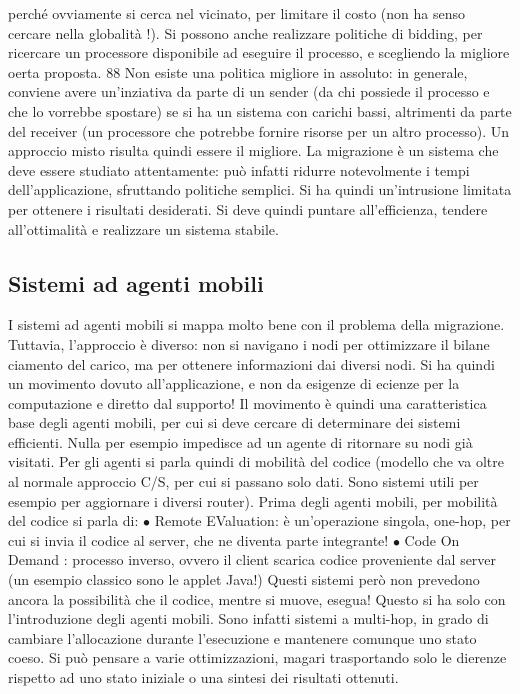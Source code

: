 perché ovviamente si cerca nel
vicinato, per limitare il costo (non ha senso cercare nella globalità !). Si possono
anche realizzare politiche di bidding, per ricercare un processore disponibile ad
eseguire il processo, e scegliendo la migliore oerta proposta.
88
Non esiste una politica migliore in assoluto: in generale, conviene avere
un'inziativa da parte di un sender (da chi possiede il processo e che lo vorrebbe
spostare) se si ha un sistema con carichi bassi, altrimenti da parte del receiver
(un processore che potrebbe fornire risorse per un altro processo). Un approccio
misto risulta quindi essere il migliore.
La migrazione è un sistema che deve essere studiato attentamente: può
infatti ridurre notevolmente i tempi dell'applicazione, sfruttando politiche semplici. Si ha quindi un'intrusione
limitata per ottenere i risultati desiderati. Si
deve quindi puntare all'efficienza, tendere all'ottimalità e realizzare un sistema
stabile.
\subsection{Sistemi ad agenti mobili}
I sistemi ad agenti mobili si mappa molto bene con il problema della migrazione.
Tuttavia, l'approccio è diverso: non si navigano i nodi per ottimizzare il bilane
ciamento del carico, ma per ottenere informazioni dai diversi nodi. Si ha quindi
un movimento dovuto all'applicazione, e non da esigenze di ecienze per la
computazione e diretto dal supporto!
Il movimento è quindi una caratteristica base degli agenti mobili, per cui si
deve cercare di determinare dei sistemi efficienti. Nulla per esempio impedisce
ad un agente di ritornare su nodi già visitati.
Per gli agenti si parla quindi di mobilità del codice (modello che va oltre
al normale approccio C/S, per cui si passano solo dati. Sono sistemi utili per
esempio per aggiornare i diversi router). Prima degli agenti mobili, per mobilità
del codice si parla di:
$\bullet$ Remote EValuation: è un'operazione singola, one-hop, per cui si invia il
codice al server, che ne diventa parte integrante!
$\bullet$ Code On Demand : processo inverso, ovvero il client scarica codice proveniente dal server (un esempio classico
sono le applet Java!)
Questi sistemi però non prevedono ancora la possibilità che il codice, mentre si
muove, esegua! Questo si ha solo con l'introduzione degli agenti mobili. Sono infatti sistemi a multi-hop, in grado di
cambiare l'allocazione durante l'esecuzione
e mantenere comunque uno stato coeso. Si può pensare a varie ottimizzazioni,
magari trasportando solo le dierenze rispetto ad uno stato iniziale o una sintesi
dei risultati ottenuti.
